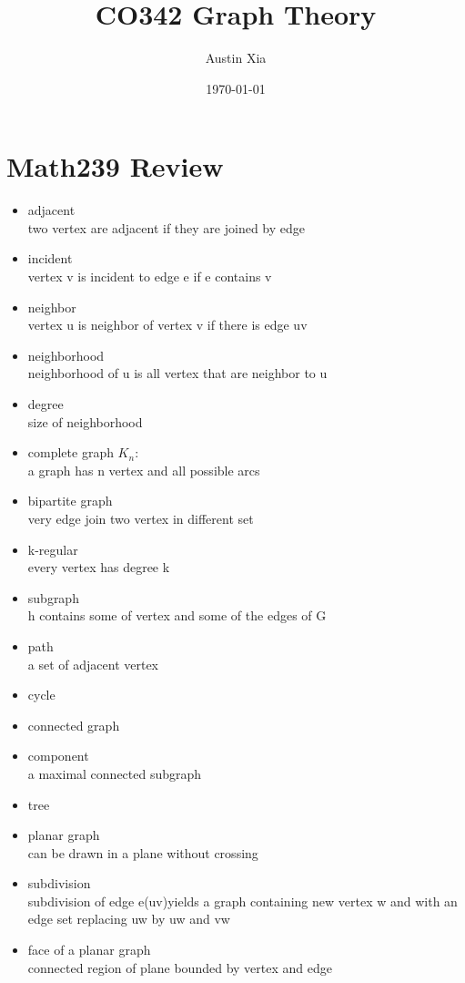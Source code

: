 \documentclass[10pt]{article}
\theoremstyle{break}
\begin{document}
\let\ref\Cref

\title{\bf{CO342 Graph Theory}}
\date{\today}
\author{Austin Xia}

\maketitle
\newpage
\tableofcontents
\listoffigures
\listoftables
\newpage



\section{Math239 Review}
	\begin{itemize}
	\item 	adjacent\\two vertex are adjacent if they are joined by edge
	\item 	incident\\vertex v is incident to edge e if e contains v
	\item 	neighbor\\vertex u is neighbor of vertex v if there is edge uv
	\item	neighborhood\\neighborhood of u is all vertex that are neighbor to u 
	\item	degree\\size of neighborhood
	\item	complete graph $K_n$:\\a graph has n vertex and all possible arcs
	\item	bipartite graph\\very edge join two vertex in different set
	\item	k-regular\\every vertex has degree k
	\item	subgraph\\h contains some of vertex and some of the edges of G
	\item	path\\a set of adjacent vertex
	\item 	cycle				
	\item	connected graph
	\item	component\\a maximal connected subgraph
	\item	tree
	\item	planar graph\\can be drawn in a plane without crossing
	\item 	subdivision	\\subdivision of edge e(uv)yields a graph containing new vertex w and with an edge set replacing uw by uw and vw
	\item	face of a planar graph\\connected region of plane bounded by vertex and edge
	\end{itemize}
\newpage
\end{document}
